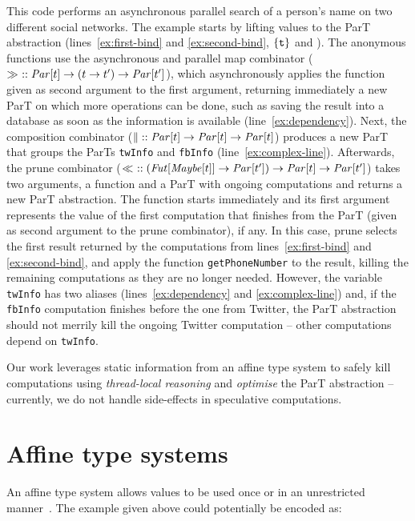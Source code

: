 \documentclass[sigplan]{acmart}
\begin{document}
This code performs an asynchronous parallel search of a person's name on two different social networks.
The example starts by lifting values to the ParT abstraction
(lines~\ref{ex:first-bind} and \ref{ex:second-bind}, $\{ \texttt{t} \}$ and ).
The anonymous functions use the asynchronous and parallel
map combinator ($\gg\!\!\ \ :: \mathit{Par}[t] \to (t \to t') \to \mathit{Par}[t']$),
which asynchronously applies the function given as second argument to the first argument,
returning immediately a new ParT on which more operations can be done,
such as saving the result into a database as soon as the information
is available (line~\ref{ex:dependency}).
Next, the composition combinator ($\| :: \mathit{Par}[t] \to \mathit{Par}[t] \to \mathit{Par}[t]$)
produces a new ParT that groups the ParTs \verb|twInfo| and \verb|fbInfo| (line~\ref{ex:complex-line}).
Afterwards, the prune combinator %
($ \ll \ :: (\mathit{Fut}[\mathit{Maybe}[t]] \to \mathit{Par}[t']) \to \mathit{Par}[t] \to \mathit{Par}[t']$)
takes two arguments, a function and a ParT with ongoing computations and returns a new ParT abstraction.
The function starts immediately and its first argument
represents the value of the first computation that finishes from the ParT 
(given as second argument to the prune combinator), if any.
%
In this case, prune selects the first result returned by the computations
from lines~\ref{ex:first-bind}
and \ref{ex:second-bind}, and apply the function
\texttt{getPhoneNumber} to the result, killing the remaining computations as
they are no longer needed.
%
However, the variable \verb|twInfo| has two aliases
(lines~\ref{ex:dependency} and \ref{ex:complex-line}) and,
if the \verb|fbInfo| computation finishes before
the one from Twitter,
the ParT abstraction should not merrily kill the ongoing
Twitter computation -- other computations depend on
\verb|twInfo|.
%

Our work leverages static information from an affine type system
to safely kill computations using \emph{thread-local reasoning}
and \emph{optimise} the ParT abstraction --
currently, we do not handle side-effects in speculative computations.

\section{Affine type systems}
\label{sec:affine-ts}

An affine type system allows values to be used
once or in an unrestricted manner~\cite{DBLP:journals/tcs/Girard87}.
The example given above could potentially be encoded as:
\end{document}
